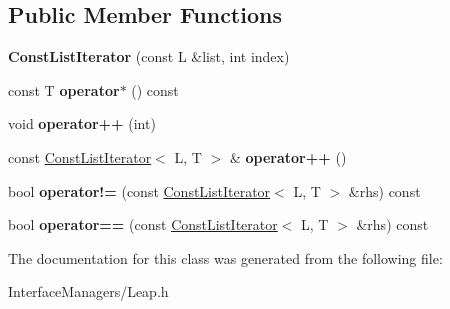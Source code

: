 \subsection*{Public Member Functions}
\begin{DoxyCompactItemize}
\item 
\hypertarget{class_leap_1_1_const_list_iterator_a2e2ea42a7871e007fe3f2aeec21f2124}{{\bfseries Const\+List\+Iterator} (const L \&list, int index)}\label{class_leap_1_1_const_list_iterator_a2e2ea42a7871e007fe3f2aeec21f2124}

\item 
\hypertarget{class_leap_1_1_const_list_iterator_a287cd054df19e28627a3a52247d9c2c9}{const T {\bfseries operator$\ast$} () const }\label{class_leap_1_1_const_list_iterator_a287cd054df19e28627a3a52247d9c2c9}

\item 
\hypertarget{class_leap_1_1_const_list_iterator_af71407ae341ce77559ddd719adbd29bb}{void {\bfseries operator++} (int)}\label{class_leap_1_1_const_list_iterator_af71407ae341ce77559ddd719adbd29bb}

\item 
\hypertarget{class_leap_1_1_const_list_iterator_af58c4e944c5a9b5718a0194f6f5c220f}{const \hyperlink{class_leap_1_1_const_list_iterator}{Const\+List\+Iterator}$<$ L, T $>$ \& {\bfseries operator++} ()}\label{class_leap_1_1_const_list_iterator_af58c4e944c5a9b5718a0194f6f5c220f}

\item 
\hypertarget{class_leap_1_1_const_list_iterator_ad79bb773f89ebd9ee5bd18c4f0d47a27}{bool {\bfseries operator!=} (const \hyperlink{class_leap_1_1_const_list_iterator}{Const\+List\+Iterator}$<$ L, T $>$ \&rhs) const }\label{class_leap_1_1_const_list_iterator_ad79bb773f89ebd9ee5bd18c4f0d47a27}

\item 
\hypertarget{class_leap_1_1_const_list_iterator_a142bf0f974c87ac456b3d204888402ee}{bool {\bfseries operator==} (const \hyperlink{class_leap_1_1_const_list_iterator}{Const\+List\+Iterator}$<$ L, T $>$ \&rhs) const }\label{class_leap_1_1_const_list_iterator_a142bf0f974c87ac456b3d204888402ee}

\end{DoxyCompactItemize}


The documentation for this class was generated from the following file\+:\begin{DoxyCompactItemize}
\item 
Interface\+Managers/Leap.\+h\end{DoxyCompactItemize}
